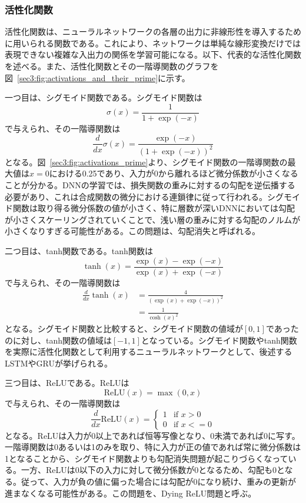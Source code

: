 \documentclass[12pt]{jarticle}
\numberwithin{equation}{section}    %
\numberwithin{figure}{section}      %
\numberwithin{table}{section}      %
\begin{document}
\subsubsection{活性化関数}
活性化関数は、ニューラルネットワークの各層の出力に非線形性を導入するために用いられる関数である。これにより、ネットワークは単純な線形変換だけでは表現できない複雑な入出力の関係を学習可能になる。以下、代表的な活性化関数を述べる。また、活性化関数とその一階導関数のグラフを図~\ref{sec3:fig:activations_and_their_prime}に示す。

一つ目は、シグモイド関数である。シグモイド関数は
\begin{equation}
    \sigma(x) = \frac{1}{1 + \exp(-x)}
\end{equation}
で与えられ、その一階導関数は
\begin{equation}
    \frac{d}{dx}\sigma(x) = \frac{\exp(-x)}{(1 + \exp(-x))^{2}}
\end{equation}
となる。図~\ref{sec3:fig:activations_prime}より、シグモイド関数の一階導関数の最大値は$x=0$における0.25であり、入力が0から離れるほど微分係数が小さくなることが分かる。DNNの学習では、損失関数の重みに対するの勾配を逆伝播する必要があり、これは合成関数の微分における連鎖律に従って行われる。シグモイド関数は取り得る微分係数の値が小さく、特に層数が深いDNNにおいては勾配が小さくスケーリングされていくことで、浅い層の重みに対する勾配のノルムが小さくなりすぎる可能性がある。この問題は、勾配消失と呼ばれる。

二つ目は、tanh関数である。tanh関数は
\begin{equation}
    \tanh(x) = \frac{\exp(x) - \exp(-x)}{\exp(x) + \exp(-x)}
\end{equation}
で与えられ、その一階導関数は
\begin{align}
    \frac{d}{dx}\tanh(x) & = \frac{4}{(\exp(x) + \exp(-x))^{2}} \\
                         & = \frac{1}{\cosh(x)^{2}}
\end{align}
となる。シグモイド関数と比較すると、シグモイド関数の値域が$[0, 1]$であったのに対し、tanh関数の値域は$[-1, 1]$となっている。シグモイド関数やtanh関数を実際に活性化関数として利用するニューラルネットワークとして、後述するLSTMやGRUが挙げられる。

三つ目は、ReLUである。ReLUは
\begin{equation}
    \text{ReLU}(x) = \max (0, x)
\end{equation}
で与えられ、その一階導関数は
\begin{equation}
    \frac{d}{dx}\text{ReLU}(x) =
    \begin{cases}
        1 & \text{if $x > 0$}  \\
        0 & \text{if $x <= 0$}
    \end{cases}
\end{equation}
となる。ReLUは入力が0以上であれば恒等写像となり、0未満であれば0に写す。一階導関数は0あるいは1のみを取り、特に入力が正の値であれば常に微分係数は1となることから、シグモイド関数よりも勾配消失問題が起こりづらくなっている。一方、ReLUは0以下の入力に対して微分係数が0となるため、勾配も0となる。従って、入力が負の値に偏った場合には勾配が0になり続け、重みの更新が進まなくなる可能性がある。この問題を、Dying ReLU問題と呼ぶ。
\end{document}
